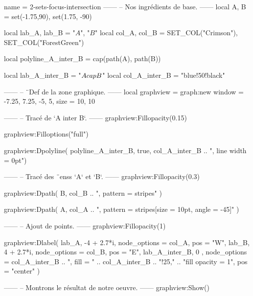 \documentclass{standalone}
\begin{document}
\begin{luadraw}{name = 2-sets-focus-intersection}
------
-- Nos ingrédients de base.
------
local A, B = set(-1.75,90), set(1.75, -90)

local lab_A, lab_B = "$A$", "$B$"
local col_A, col_B = SET_COL("Crimson"), SET_COL("ForestGreen")

local polyline_A_inter_B = cap(path(A), path(B))

local lab_A_inter_B       = "$A \\cap B$"
local col_A_inter_B       = "blue!50!black"

------
-- ¨Def de la zone graphique.
------
local graphview = graph:new{
  window = {-7.25, 7.25, -5, 5},
  size   = {10, 10}
}

------
-- Tracé de `A inter B`.
------
graphview:Fillopacity(0.15)

graphview:Filloptions("full")

graphview:Dpolyline(
  polyline_A_inter_B,
  true,
  col_A_inter_B .. ", line width = 0pt")

------
-- Tracé des ¨enss `A` et `B`.
------
graphview:Fillopacity(0.3)

graphview:Dpath(
  B,
  col_B .. ", pattern = stripes"
)

graphview:Dpath(
  A,
  col_A .. ", pattern = {stripes[size = 10pt, angle = -45]}"
)


------
-- Ajout de points.
------
graphview:Fillopacity(1)

graphview:Dlabel(
  lab_A, -4 + 2.7*i, {node_options = col_A, pos = "W"},
  lab_B, 4 + 2.7*i, {node_options = col_B, pos = "E"},
  lab_A_inter_B, 0 , {
    node_options = col_A_inter_B
                .. ", fill = " .. col_A_inter_B .. "!25,"
                .. "fill opacity = 1",
    pos = "center"
  }
)

------
-- Montrons le résultat de notre oeuvre.
------
graphview:Show()
\end{luadraw}
\end{document}
